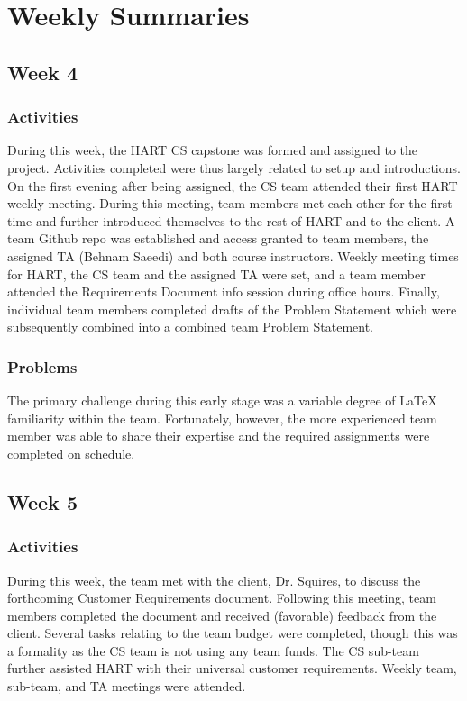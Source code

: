 \documentclass[journal,10pt,onecolumn,compsoc]{IEEEtran}
\begin{document}
\section{Weekly Summaries}

	\subsection{Week 4}
		
		\subsubsection{Activities}
			During this week, the HART CS capstone was formed and assigned to the project.
			Activities completed were thus largely related to setup and introductions.
			On the first evening after being assigned, the CS team attended their first HART weekly meeting.
			During this meeting, team members met each other for the first time and further introduced themselves to the rest of HART and to the client.
			A team Github repo was established and access granted to team members, the assigned TA (Behnam Saeedi) and both course instructors.
			Weekly meeting times for HART, the CS team and the assigned TA were set, and a team member attended the Requirements Document info session during office hours.
			Finally, individual team members completed drafts of the Problem Statement which were subsequently combined into a combined team Problem Statement.
		
		\subsubsection{Problems}
			The primary challenge during this early stage was a variable degree of LaTeX familiarity within the team. 
			Fortunately, however, the more experienced team member was able to share their expertise and the required assignments were completed on schedule.
	
	\subsection{Week 5}
	
		\subsubsection{Activities}
			During this week, the team met with the client, Dr. Squires, to discuss the forthcoming Customer Requirements document.
			Following this meeting, team members completed the document and received (favorable) feedback from the client.
			Several tasks relating to the team budget were completed, though this was a formality as the CS team is not using any team funds.
			The CS sub-team further assisted HART with their universal customer requirements.
			Weekly team, sub-team, and TA meetings were attended.
			
\end{document}

